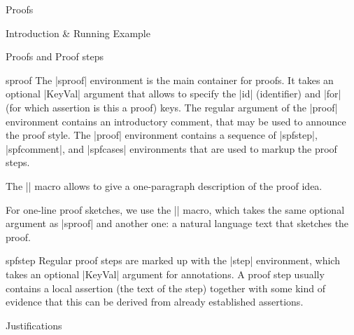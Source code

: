 \begin{sfragment}{Proofs}
\begin{sfragment}{Introduction \& Running Example}
\end{sfragment}

\begin{sfragment}{Proofs and Proof steps}

  \begin{environment}{sproof}
    The |sproof| environment is the main container for proofs. It takes an optional
    |KeyVal| argument that allows to specify the |id| (identifier) and |for| (for which
    assertion is this a proof) keys. The regular argument of the |proof| environment
    contains an introductory comment, that may be used to announce the proof style. The
    |proof| environment contains a sequence of |spfstep|, |spfcomment|, and |spfcases|
    environments that are used to markup the proof steps.
  \end{environment}
  
  \begin{function}{\spfidea}
    The |\spfidea| macro allows to give a one-paragraph description of the proof idea.
  \end{function}
  
  \begin{function}{\spfsketch}
    For one-line proof sketches, we use the |\spfsketch| macro, which takes the same
    optional argument as |sproof| and another one: a natural language text that sketches
    the proof.
  \end{function}
  
  \begin{environment}{spfstep}
    Regular proof steps are marked up with the |step| environment, which takes an optional
    |KeyVal| argument for annotations. A proof step usually contains a local assertion
    (the text of the step) together with some kind of evidence that this can be derived
    from already established assertions.
  \end{environment}
  
\end{sfragment}

\begin{sfragment}{Justifications}

\end{sfragment}
\end{sfragment}
